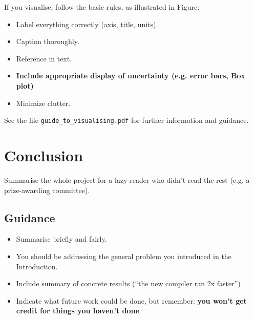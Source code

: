 \documentclass{l4proj}
\begin{document}
If you visualise, follow the basic rules, as illustrated in Figure:
\begin{itemize}
    \item Label everything correctly (axis, title, units).
    \item Caption thoroughly.
    \item Reference in text.
    \item \textbf{Include appropriate display of uncertainty (e.g. error bars, Box plot)}
    \item Minimize clutter.
\end{itemize}

See the file \texttt{guide\_to\_visualising.pdf} for further information and guidance.



\chapter{Conclusion}

Summarise the whole project for a lazy reader who didn't read the rest (e.g. a prize-awarding committee).

\section{Guidance}
\begin{itemize}
    \item
          Summarise briefly and fairly.
    \item
          You should be addressing the general problem you introduced in the
          Introduction.
    \item
          Include summary of concrete results (``the new compiler ran 2x
          faster'')
    \item
          Indicate what future work could be done, but remember: \textbf{you
              won't get credit for things you haven't done}.
\end{itemize}


\end{document}
